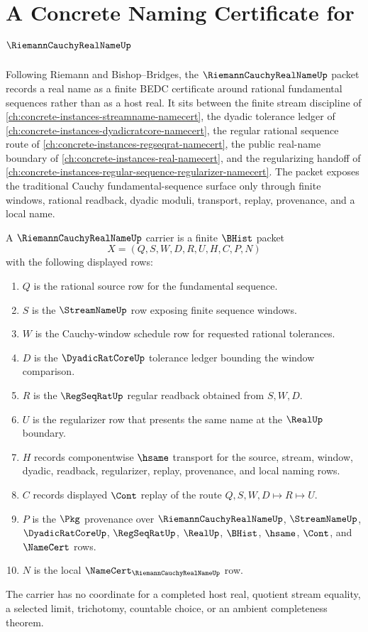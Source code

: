 \chapter{A Concrete Naming Certificate for $\RiemannCauchyRealNameUp$}
\label{ch:concrete-instances-riemann-cauchy-real-name-namecert}

Following Riemann and Bishop--Bridges, the $\RiemannCauchyRealNameUp$ packet records a real name as a finite BEDC certificate around rational fundamental sequences rather than as a host real. It sits between the finite stream discipline of \autoref{ch:concrete-instances-streamname-namecert}, the dyadic tolerance ledger of \autoref{ch:concrete-instances-dyadicratcore-namecert}, the regular rational sequence route of \autoref{ch:concrete-instances-regseqrat-namecert}, the public real-name boundary of \autoref{ch:concrete-instances-real-namecert}, and the regularizing handoff of \autoref{ch:concrete-instances-regular-sequence-regularizer-namecert}. The packet exposes the traditional Cauchy fundamental-sequence surface only through finite windows, rational readback, dyadic moduli, transport, replay, provenance, and a local name.

\begin{definition}
\label{def:riemann-cauchy-real-name-carrier}
A $\RiemannCauchyRealNameUp$ carrier is a finite $\BHist$ packet
$$
X=(Q,S,W,D,R,U,H,C,P,N)
$$
with the following displayed rows:
\begin{enumerate}
\item $Q$ is the rational source row for the fundamental sequence.
\item $S$ is the $\StreamNameUp$ row exposing finite sequence windows.
\item $W$ is the Cauchy-window schedule row for requested rational tolerances.
\item $D$ is the $\DyadicRatCoreUp$ tolerance ledger bounding the window comparison.
\item $R$ is the $\RegSeqRatUp$ regular readback obtained from $S,W,D$.
\item $U$ is the regularizer row that presents the same name at the $\RealUp$ boundary.
\item $H$ records componentwise $\hsame$ transport for the source, stream, window, dyadic, readback, regularizer, replay, provenance, and local naming rows.
\item $C$ records displayed $\Cont$ replay of the route $Q,S,W,D \longmapsto R \longmapsto U$.
\item $P$ is the $\Pkg$ provenance over $\RiemannCauchyRealNameUp$, $\StreamNameUp$, $\DyadicRatCoreUp$, $\RegSeqRatUp$, $\RealUp$, $\BHist$, $\hsame$, $\Cont$, and $\NameCert$ rows.
\item $N$ is the local $\NameCert_{\RiemannCauchyRealNameUp}$ row.
\end{enumerate}
The carrier has no coordinate for a completed host real, quotient stream equality, a selected limit, trichotomy, countable choice, or an ambient completeness theorem.
\end{definition}

